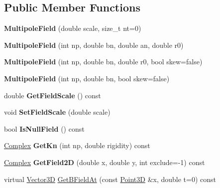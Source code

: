 \subsection*{Public Member Functions}
\begin{DoxyCompactItemize}
\item 
\mbox{\label{classMultipoleField_aeb879644e25fe0ba14749b0546dccf37}} 
{\bfseries Multipole\+Field} (double scale, size\+\_\+t nt=0)
\item 
\mbox{\label{classMultipoleField_a4b2629b87d7947d3d30c6e0556bd342f}} 
{\bfseries Multipole\+Field} (int np, double bn, double an, double r0)
\item 
\mbox{\label{classMultipoleField_a36f459118517759deac6acead57296b0}} 
{\bfseries Multipole\+Field} (int np, double bn, double r0, bool skew=false)
\item 
\mbox{\label{classMultipoleField_a638a295dab979eae41601880f3be591c}} 
{\bfseries Multipole\+Field} (int np, double bn, bool skew=false)
\item 
\mbox{\label{classMultipoleField_ad6afcf837d67f053ed08f1d722e5bad8}} 
double {\bfseries Get\+Field\+Scale} () const
\item 
\mbox{\label{classMultipoleField_a22fafceaf2021a213b53268f61ca8dd8}} 
void {\bfseries Set\+Field\+Scale} (double scale)
\item 
\mbox{\label{classMultipoleField_ac1b5db6245cd557d04a9bdeeb9942e12}} 
bool {\bfseries Is\+Null\+Field} () const
\item 
\mbox{\label{classMultipoleField_a02d9d48e2a7a1d2be9aefbf66044e2b5}} 
\hyperlink{classComplex}{Complex} {\bfseries Get\+Kn} (int np, double rigidity) const
\item 
\mbox{\label{classMultipoleField_a5e397a69e6a566663545de9f168d849e}} 
\hyperlink{classComplex}{Complex} {\bfseries Get\+Field2D} (double x, double y, int exclude=-\/1) const
\item 
virtual \hyperlink{classTVec3D}{Vector3D} \hyperlink{classMultipoleField_aa3dd644cac091d6f384196245bfbb7dd}{Get\+B\+Field\+At} (const \hyperlink{classTVec3D}{Point3D} \&x, double t=0) const

\end{DoxyCompactItemize}
